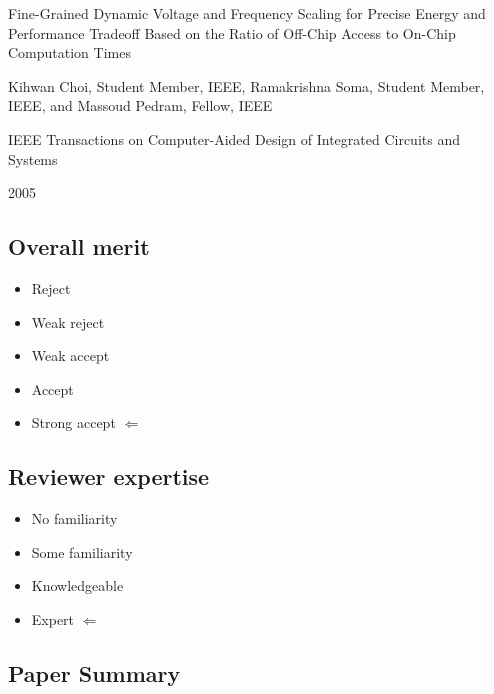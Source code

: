 \documentclass[11pt,letterpaper]{article}
\begin{document}
	\noindent {\bf \textcolor{blue}{Paper Title: }}
	Fine-Grained Dynamic Voltage and Frequency Scaling for Precise Energy and Performance Tradeoff Based on the Ratio of Off-Chip Access to On-Chip Computation Times
	
	\noindent {\bf \textcolor{blue}{Author(s): }}
	Kihwan Choi, Student Member, IEEE, Ramakrishna Soma, Student Member, IEEE, and Massoud Pedram, Fellow, IEEE
	
	\noindent {\bf \textcolor{blue}{Conference/Journal: }}
	IEEE Transactions on Computer-Aided Design of Integrated Circuits and Systems
	
	\noindent {\bf \textcolor{blue}{Year of Publication: }}
	2005
	
	\noindent\makebox[\linewidth]{\rule{\textwidth}{0.4pt}}
	
	\subsection*{Overall merit}
	
	\begin{itemize}[noitemsep]
		\item Reject 
		\item Weak reject
		\item Weak accept
		\item Accept
		\item Strong accept $\Leftarrow$
	\end{itemize}
	
	\subsection*{Reviewer expertise}
	
	\begin{itemize}[noitemsep]
		\item No familiarity 
		\item Some familiarity
		\item Knowledgeable
		\item Expert $\Leftarrow$
	\end{itemize}
	
	\subsection*{Paper Summary}
	
\end{document}
